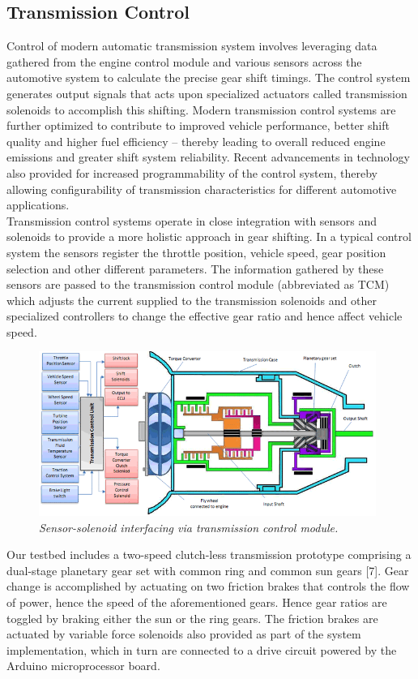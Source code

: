 \documentclass{article}
\begin{document}
\subsection{Transmission Control}
Control of modern automatic transmission system involves leveraging data gathered from the engine control module and various sensors across the automotive system to calculate the precise gear shift timings. The control system generates output signals that acts upon specialized actuators called transmission solenoids to accomplish this shifting. Modern transmission control systems are further optimized to contribute to improved vehicle performance, better shift quality and higher fuel efficiency – thereby leading to overall reduced engine emissions and greater shift system reliability. Recent advancements in technology also provided for increased programmability of the control system, thereby allowing configurability of transmission characteristics for different automotive applications. \\

\noindent Transmission control systems operate in close integration with sensors and solenoids to provide a more holistic approach in gear shifting. In a typical control system the sensors register the throttle position, vehicle speed, gear position selection and other different parameters. The information gathered by these sensors are passed to the transmission control module (abbreviated as TCM) which adjusts the current supplied to the transmission solenoids and other specialized controllers to change the effective gear ratio and hence affect vehicle speed. \\

\begin{figure}[!ht]
\centering 
\includegraphics[width=11cm]{fig_5.png}
\caption{\small \sl Sensor-solenoid interfacing via transmission control module.}  
\end{figure}

\noindent Our testbed includes a two-speed clutch-less transmission prototype comprising a dual-stage planetary gear set with common ring and common sun gears [7]. Gear change is accomplished by actuating on two friction brakes that controls the flow of power, hence the speed of the aforementioned gears. Hence gear ratios are toggled by braking either the sun or the ring gears. The friction brakes are actuated by variable force solenoids also provided as part of the system implementation, which in turn are connected to a drive circuit powered by the Arduino microprocessor board. 
\end{document}
